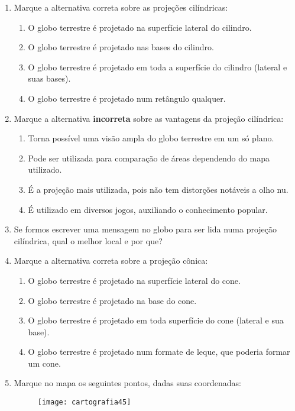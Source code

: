{\begin{enumerate}
\item Marque a alternativa correta sobre as projeções cilíndricas:
\begin{enumerate}
\item O globo terrestre é projetado na superfície lateral do cilindro.
\item O globo terrestre é projetado nas bases do cilindro.
\item O globo terrestre é projetado em toda a  superfície do cilindro (lateral e suas bases).
\item O globo terrestre é projetado num retângulo qualquer.
\end{enumerate}


\item Marque a alternativa \textbf{incorreta} sobre as vantagens da projeção cilíndrica:
\begin{enumerate}
\item Torna possível uma visão ampla do globo terrestre em um só plano.
\item Pode ser utilizada para comparação de áreas dependendo do mapa utilizado.
\item É a projeção mais utilizada, pois não tem distorções notáveis a olho nu.
\item É utilizado em diversos jogos, auxiliando o conhecimento popular.
\end{enumerate}

\item Se formos escrever uma mensagem no globo para ser lida numa projeção cilíndrica, qual o melhor local e por que?

\item Marque a alternativa correta sobre a projeção cônica:
\begin{enumerate}
\item O globo terrestre é projetado na superfície lateral do cone.
\item O globo terrestre é projetado na base do cone.
\item O globo terrestre é projetado em toda superfície do cone (lateral e sua base).
\item O globo terrestre é projetado num formate de leque, que poderia formar um cone.
\end{enumerate}

\item Marque no mapa os seguintes pontos, dadas suas coordenadas:

\begin{figure}[H]
\centering
\texttt{[image: cartografia45]}


\end{figure}
\end{enumerate}}
